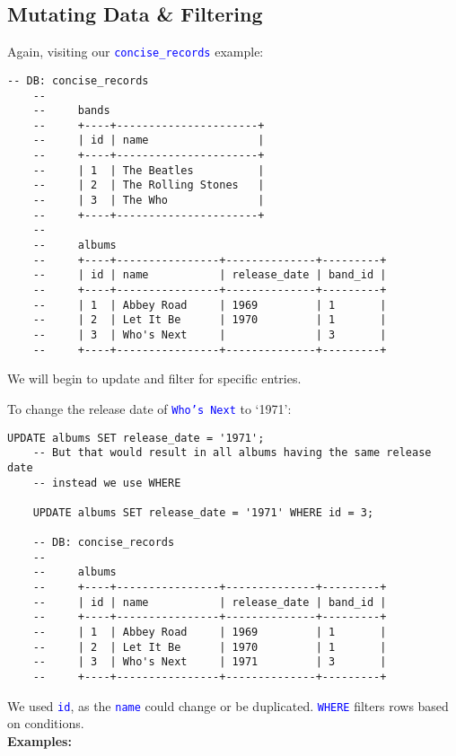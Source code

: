\subsection{Mutating Data \& Filtering}
\noindent
Again, visiting our \textcolor{blue}{\texttt{concise\_records}} example:

\begin{lstlisting}[style=sql]
    -- DB: concise_records
    --
    --     bands
    --     +----+----------------------+
    --     | id | name                 |
    --     +----+----------------------+
    --     | 1  | The Beatles          |
    --     | 2  | The Rolling Stones   |
    --     | 3  | The Who              |
    --     +----+----------------------+
    --    
    --     albums
    --     +----+----------------+--------------+---------+
    --     | id | name           | release_date | band_id |
    --     +----+----------------+--------------+---------+
    --     | 1  | Abbey Road     | 1969         | 1       |
    --     | 2  | Let It Be      | 1970         | 1       |
    --     | 3  | Who's Next     |              | 3       |
    --     +----+----------------+--------------+---------+
\end{lstlisting}

\vspace{1em}
\noindent
We will begin to update and filter for specific entries.

\newpage

\noindent
To change the release date of \textcolor{blue}{\texttt{Who's Next} }to `1971':
\begin{lstlisting}[style=sql]
    UPDATE albums SET release_date = '1971';
    -- But that would result in all albums having the same release date
    -- instead we use WHERE

    UPDATE albums SET release_date = '1971' WHERE id = 3;

    -- DB: concise_records
    --
    --     albums
    --     +----+----------------+--------------+---------+
    --     | id | name           | release_date | band_id |
    --     +----+----------------+--------------+---------+
    --     | 1  | Abbey Road     | 1969         | 1       |
    --     | 2  | Let It Be      | 1970         | 1       |
    --     | 3  | Who's Next     | 1971         | 3       |
    --     +----+----------------+--------------+---------+
\end{lstlisting}

\noindent
We used \textcolor{blue}{\texttt{id}}, as the \textcolor{blue}{\texttt{name}} could change or
be duplicated. \textcolor{blue}{\texttt{WHERE}} filters rows based on conditions.\\
\textbf{Examples:}\\

